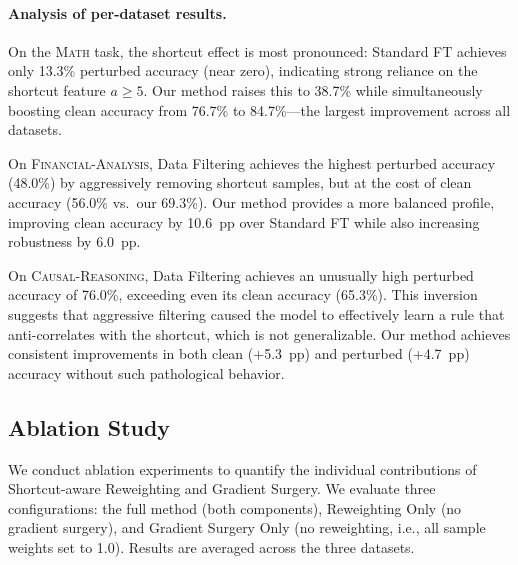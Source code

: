 \paragraph{Analysis of per-dataset results.}
On the \textsc{Math} task, the shortcut effect is most pronounced: Standard FT achieves only 13.3\% perturbed accuracy (near zero), indicating strong reliance on the shortcut feature $a \geq 5$. Our method raises this to 38.7\% while simultaneously boosting clean accuracy from 76.7\% to 84.7\%---the largest improvement across all datasets.

On \textsc{Financial-Analysis}, Data Filtering achieves the highest perturbed accuracy (48.0\%) by aggressively removing shortcut samples, but at the cost of clean accuracy (56.0\% vs.\ our 69.3\%). Our method provides a more balanced profile, improving clean accuracy by 10.6~pp over Standard FT while also increasing robustness by 6.0~pp.

On \textsc{Causal-Reasoning}, Data Filtering achieves an unusually high perturbed accuracy of 76.0\%, exceeding even its clean accuracy (65.3\%). This inversion suggests that aggressive filtering caused the model to effectively learn a rule that anti-correlates with the shortcut, which is not generalizable. Our method achieves consistent improvements in both clean (+5.3~pp) and perturbed (+4.7~pp) accuracy without such pathological behavior.

\subsection{Ablation Study}
\label{sec:ablation}

We conduct ablation experiments to quantify the individual contributions of Shortcut-aware Reweighting and Gradient Surgery. We evaluate three configurations: the full method (both components), Reweighting Only (no gradient surgery), and Gradient Surgery Only (no reweighting, i.e., all sample weights set to 1.0). Results are averaged across the three datasets.

